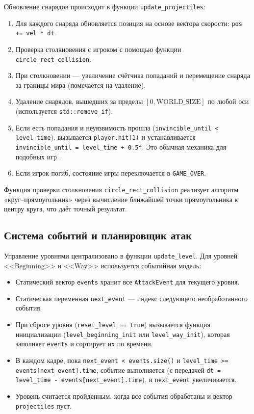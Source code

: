 \documentclass[../main.tex]{subfiles}
\begin{document}
Обновление снарядов происходит в функции \texttt{update\_projectiles}:
\begin{enumerate}
	\item Для каждого снаряда обновляется позиция на основе вектора скорости: \texttt{pos += vel * dt}.
	\item Проверка столкновения с игроком с помощью функции \\ \texttt{circle\_rect\_collision}.
	\item При столкновении — увеличение счётчика попаданий и перемещение снаряда за границы мира (помечается на удаление).
	\item Удаление снарядов, вышедших за пределы $[0, \text{WORLD\_SIZE}]$ по любой оси (используется \texttt{std::remove\_if}).
	\item Если есть попадания и неуязвимость прошла (\texttt{invincible\_until < level\_time}), вызывается \texttt{player.hit(1)} и устанавливается \texttt{invincible\_until = level\_time + 0.5f}. Это обычная механика для подобных игр \cite{terraria_wiki_inv_frame}\cite{calamity_wiki_inv_frame}.
	\item Если игрок погиб, состояние игры переключается в \texttt{GAME\_OVER}.
\end{enumerate}

Функция проверки столкновения \texttt{circle\_rect\_collision} реализует алгоритм «круг–прямоугольник» через вычисление ближайшей точки прямоугольника к центру круга, что даёт точный результат.

\subsection{Система событий и планировщик атак}

Управление уровнями централизовано в функции \texttt{update\_level}. Для уровней <<Beginning>> и <<Way>> используется событийная модель:
\begin{itemize}
	\item Статический вектор \texttt{events} хранит все \texttt{AttackEvent} для текущего уровня.
	\item Статическая переменная \texttt{next\_event} — индекс следующего необработанного события.
	\item При сбросе уровня (\texttt{reset\_level == true}) вызывается функция инициализации (\texttt{level\_beginning\_init} или \texttt{level\_way\_init}), которая заполняет \texttt{events} и сортирует их по времени.
	\item В каждом кадре, пока \texttt{next\_event < events.size()} и \texttt{level\_time >= events[next\_event].time}, событие выполняется (с передачей \texttt{dt = level\_time - events[next\_event].time}), и \texttt{next\_event} увеличивается.
	\item Уровень считается пройденным, когда все события обработаны и вектор \texttt{projectiles} пуст.
\end{itemize}
\end{document}
